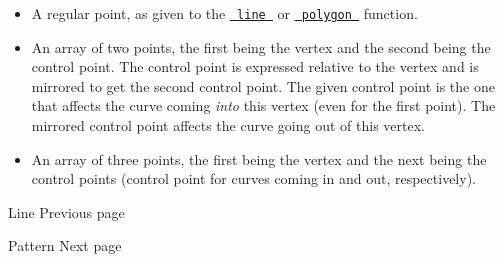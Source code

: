 \begin{itemize}
\tightlist
\item
  A regular point, as given to the
  \href{/docs/reference/visualize/line/}{\texttt{\ line\ }} or
  \href{/docs/reference/visualize/polygon/}{\texttt{\ polygon\ }}
  function.
\item
  An array of two points, the first being the vertex and the second
  being the control point. The control point is expressed relative to
  the vertex and is mirrored to get the second control point. The given
  control point is the one that affects the curve coming \emph{into}
  this vertex (even for the first point). The mirrored control point
  affects the curve going out of this vertex.
\item
  An array of three points, the first being the vertex and the next
  being the control points (control point for curves coming in and out,
  respectively).
\end{itemize}

\href{/docs/reference/visualize/line/}{\pandocbounded{}}

{ Line } { Previous page }

\href{/docs/reference/visualize/pattern/}{\pandocbounded{}}

{ Pattern } { Next page }
